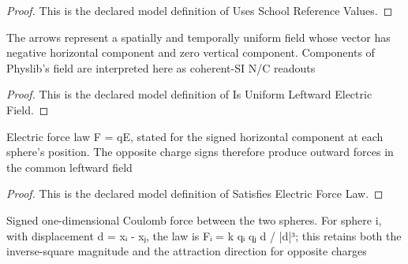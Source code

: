 \begin{proof}
  This is the declared model definition of Uses School Reference Values.
\end{proof}
\begin{definition}
  \label{def:physics:phyx-mini-0906:phyxminiproblems-problemphyxmini0906-isuniformleftwardelectricfield}
  The arrows represent a spatially and temporally uniform field whose vector has negative horizontal component and zero vertical component. Components of Physlib's field are interpreted here as coherent-SI N/C readouts
\end{definition}
\begin{proof}
  This is the declared model definition of Is Uniform Leftward Electric Field.
\end{proof}
\begin{definition}
  \label{def:physics:phyx-mini-0906:phyxminiproblems-problemphyxmini0906-satisfieselectricforcelaw}
  Electric force law F = qE, stated for the signed horizontal component at each sphere's position. The opposite charge signs therefore produce outward forces in the common leftward field
\end{definition}
\begin{proof}
  This is the declared model definition of Satisfies Electric Force Law.
\end{proof}
\begin{definition}
  \label{def:physics:phyx-mini-0906:phyxminiproblems-problemphyxmini0906-satisfiescoulombinteractionlaw}
  Signed one-dimensional Coulomb force between the two spheres. For sphere i, with displacement d = xᵢ - xⱼ, the law is Fᵢ = k qᵢ qⱼ d / |d|³; this retains both the inverse-square magnitude and the attraction direction for opposite charges
\end{definition}
